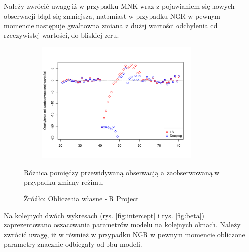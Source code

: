 \documentclass[man,mfu]{mgrwms}
\begin{document}
Należy zwrócić uwagę iż w przypadku MNK wraz z pojawianiem się nowych obserwacji błąd się zmniejsza, natomiast w przypadku NGR w pewnym momencie następuje gwałtowna zmiana z dużej wartości odchylenia od rzeczywistej wartości, do bliskiej zeru.

\begin{figure}[H]
\centering
\vspace{-10pt}
\includegraphics[width=100mm,height = 60mm]{strepsilon}
\caption{Różnica pomiędzy przewidywaną obserwacją a zaobserwowaną w przypadku zmiany reżimu.}
\caption*{Źródło: Obliczenia własne - R Project}
\label{fig:epsilon}
\vspace{-10pt}
\end{figure}

Na kolejnych dwóch wykresach (rys. \ref{fig:intercept} i rys. \ref{fig:beta}) zaprezentowano oszacowania parametrów modelu na kolejnych oknach. Należy zwrócić uwagę, iż w również w przypadku NGR w pewnym momencie obliczone parametry znacznie odbiegały od obu modeli. 
\end{document}
